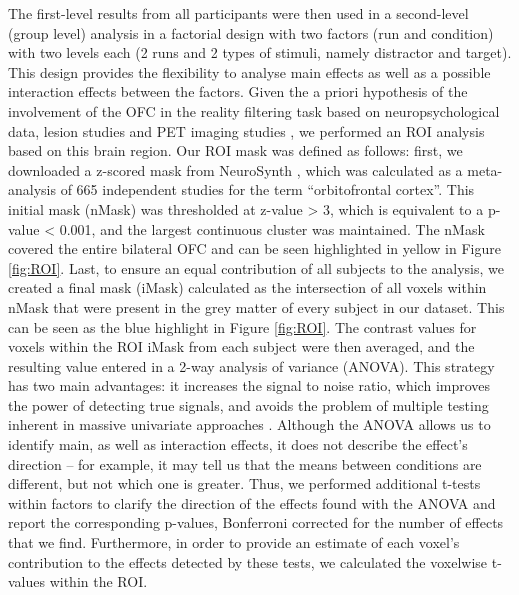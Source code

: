 The first-level results from all participants were then used in a second-level (group level) analysis in a factorial design with two factors (run and condition) with two levels each (2 runs and 2 types of stimuli, namely distractor and target). This design provides the flexibility to analyse main effects as well as a possible interaction effects between the factors. Given the a priori hypothesis of the involvement of the OFC in the reality filtering task based on neuropsychological data, lesion studies and PET imaging studies \citep{Schnider1996, Schnider1999, Treyer2003} , we performed an ROI analysis based on this brain region. Our ROI mask was defined as follows:  first, we downloaded a z-scored mask from NeuroSynth \citep{Wager2011a}, which was calculated as a meta-analysis of 665 independent studies for the term “orbitofrontal cortex”. This initial mask (nMask) was thresholded at z-value > 3, which is equivalent to a p-value < 0.001, and the largest continuous cluster was maintained. The nMask covered the entire bilateral OFC and can be seen highlighted in yellow in Figure \ref{fig:ROI}. Last, to ensure an equal contribution of all subjects to the analysis, we created a final mask (iMask) calculated as the intersection of all voxels within nMask that were present in the grey matter of every subject in our dataset. This can be seen as the blue highlight in Figure \ref{fig:ROI}. The contrast values for voxels within the ROI iMask from each subject were then averaged, and the resulting value entered in a 2-way analysis of variance (ANOVA). This strategy has two main advantages: it increases the signal to noise ratio, which improves the power of detecting true signals, and avoids the problem of multiple testing inherent in massive univariate approaches \citep{Benjamini2007, Meskaldji2015}. Although the ANOVA allows us to identify main, as well as interaction effects, it does not describe the effect’s direction – for example, it may tell us that the means between conditions are different, but not which one is greater. Thus, we performed additional t-tests within factors to clarify the direction of the effects found with the ANOVA and report the corresponding p-values, Bonferroni corrected for the number of effects that we find. Furthermore, in order to provide an estimate of each voxel’s contribution to the effects detected by these tests, we calculated the voxelwise t-values within the ROI.



